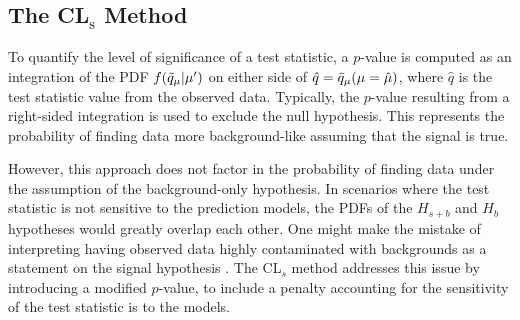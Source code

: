 \subsection{The CL$_{\mathrm{s}}$ Method}
\label{sec:cls}

To quantify the level of significance of a test statistic, a $p$-value is computed as an integration of the PDF $f(\Tilde{q}_{\mu}|\mu^{\prime})$ on either side of $\hat{q} = \Tilde{q}_{\mu}(\mu = \hat{\mu}) $, where $\hat{q}$ is the test statistic value from the observed data.
Typically, the $p$-value resulting from a right-sided integration is used to exclude the null hypothesis.
This represents the probability of finding data more background-like assuming that the signal is true.



However, this approach does not factor in the probability of finding data under the assumption of the background-only hypothesis.
In scenarios where the test statistic is not sensitive to the prediction models, the PDFs of the $H_{s+b}$ and $H_b$ hypotheses would greatly overlap each other.
One might make the mistake of interpreting having observed data highly contaminated with backgrounds as a statement on the signal hypothesis \cite{CLs_Read}.
The CL$_s$ method addresses this issue by introducing a modified $p$-value, to include a penalty accounting for the sensitivity of the test statistic is to the models.

